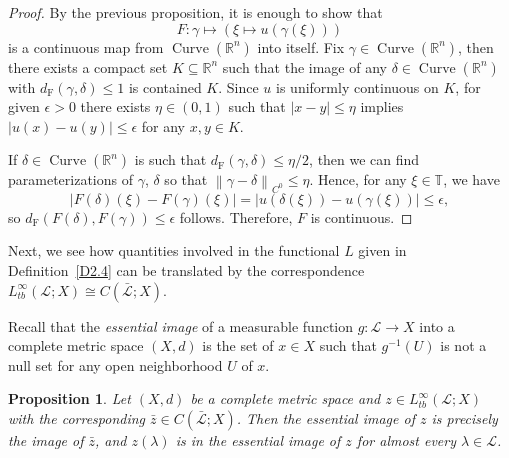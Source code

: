 \documentclass[reqno,centertags,12pt]{amsart}
\newtheorem{proposition}[theorem]{Proposition}
\theoremstyle{definition}
\numberwithin{equation}{section}
\newcommand{\abs}[1]{\left\lvert#1\right\rvert}
\newcommand{\norm}[1]{\left\|#1\right\|}
\newcommand{\bbR}{{\mathbb{R}}}
\newcommand{\bbT}{{\mathbb{T}}}
\begin{document}
\begin{proof}
    By the previous proposition, it is enough to show that
    \[
        F\colon \gamma \mapsto \left(\xi \mapsto u(\gamma(\xi))\right)
    \]
    is a continuous map from $\operatorname{Curve}(\bbR^{n})$ into itself.
    Fix $\gamma\in\operatorname{Curve}(\bbR^{n})$, then there exists a compact set
    $K\subseteq\bbR^{n}$ such that the image of
    any $\delta\in\operatorname{Curve}(\bbR^{n})$ with
    $d_{\mathrm{F}}(\gamma,\delta) \leq 1$ is contained $K$.
    Since $u$ is uniformly continuous on $K$, for given $\epsilon>0$
    there exists $\eta\in(0,1)$ such that $\abs{x - y}\leq\eta$ implies
    $\abs{u(x) - u(y)}\leq\epsilon$ for any $x,y\in K$.

    If $\delta\in\operatorname{Curve}(\bbR^{n})$ is such that
    $d_{\mathrm{F}}(\gamma,\delta) \leq \eta/2$, then we can find
    parameterizations of $\gamma$, $\delta$ so that $\norm{\gamma - \delta}_{C^{0}} \leq \eta$.
    Hence, for any $\xi\in\bbT$, we have
    \[
        \abs{F(\delta)(\xi) - F(\gamma)(\xi)}
        = \abs{u(\delta(\xi)) - u(\gamma(\xi))} \leq \epsilon,
    \]
    so $d_{\mathrm{F}}(F(\delta),F(\gamma)) \leq \epsilon$ follows.
    Therefore, $F$ is continuous.
\end{proof}

Next, we see how quantities involved in the functional $L$ given in
Definition~\ref{D2.4} can be translated by the correspondence
$L_{tb}^{\infty}(\mathcal{L};X) \cong C(\bar{\mathcal{L}};X)$.

Recall that the \emph{essential image} of a measurable function
$g\colon\mathcal{L}\to X$ into a complete metric space $(X,d)$ is the set of
$x\in X$ such that $g^{-1}(U)$ is not a null set for any open neighborhood $U$ of $x$.

\begin{proposition}
    Let $(X,d)$ be a complete metric space and $z\in L_{tb}^{\infty}(\mathcal{L};X)$
    with the corresponding $\bar{z}\in C(\bar{\mathcal{L}};X)$.
    Then the essential image of $z$ is precisely the image of $\bar{z}$,
    and $z(\lambda)$ is in the essential image of $z$ for almost every $\lambda\in\mathcal{L}$.
\end{proposition}
\end{document}
